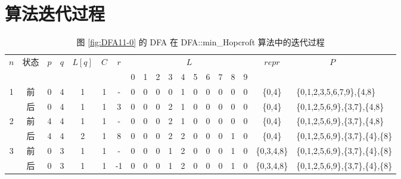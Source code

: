 \chapter{算法迭代过程}
\begin{table}[!htbp]
    \caption{图 \ref{fig:DFA11-0} 的 DFA 在 DFA::min\_Hopcroft 算法中的迭代过程}
    \label{tab:hopcroft}
    \centering
    \footnotesize%
    \setlength{\tabcolsep}{4pt}%
    \renewcommand{\arraystretch}{1.2}%
    \begin{tabular}{ccccccc|cccccccccc|cl} 
        \toprule%
        \multirow{2}{*}{$n$} & \multirow{2}{*}{状态} & \multirow{2}{*}{$p$} & \multirow{2}{*}{$q$} & \multirow{2}{*}{$L[q]$} & \multirow{2}{*}{$C$} & \multirow{2}{*}{$r$} & \multicolumn{10}{c|}{$L$} & \multirow{2}{*}{$repr$} & \multirow{2}{*}{$\mbox{　　　　}P$}  \\
        \cline{8-17}             &                   &                     &                    &                       &                   &    & 0 & 1 &2 &3 &4 &5 &6 &7 & 8 & 9 & & \\
        \midrule%
        \multirow{2}{*}{1} & 前 & 0 & 4 & 1 & 1 & -  & 0 & 0 & 0 & 0 & 1 & 0 & 0 & 0 & 0 & 0 & \{0,4\} & \{0,1,2,3,5,6,7,9\},\{4,8\} \\
                           & 后 & 0 & 4 & 1 & 1 & 3  & 0 & 0 & 0 & 2 & 1 & 0 & 0 & 0 & 0 & 0 & \{0,4\} & \{0,1,2,5,6,9\},\{3,7\},\{4,8\} \\
        \midrule
        \multirow{2}{*}{2} & 前 & 4 & 4 & 1 & 1 & -  & 0 & 0 & 0 & 2 & 1 & 0 & 0 & 0 & 0 & 0 & \{0,4\} & \{0,1,2,5,6,9\},\{3,7\},\{4,8\} \\
                           & 后 & 4 & 4 & 2 & 1 & 8  & 0 & 0 & 0 & 2 & 2 & 0 & 0 & 0 & 1 & 0 & \{0,4\} & \{0,1,2,5,6,9\},\{3,7\},\{4\},\{8\} \\
        \midrule
        \multirow{2}{*}{3} & 前 & 0 & 3 & 1 & 1 & -  & 0 & 0 & 0 & 1 & 2 & 0 & 0 & 0 & 1 & 0 & \{0,3,4,8\} & \{0,1,2,5,6,9\},\{3,7\},\{4\},\{8\} \\
                           & 后 & 0 & 3 & 1 & 1 & -1 & 0 & 0 & 0 & 1 & 2 & 0 & 0 & 0 & 1 & 0 & \{0,3,4,8\} & \{0,1,2,5,6,9\},\{3,7\},\{4\},\{8\} \\
        \midrule
        

\end{tabular}
\end{table}
